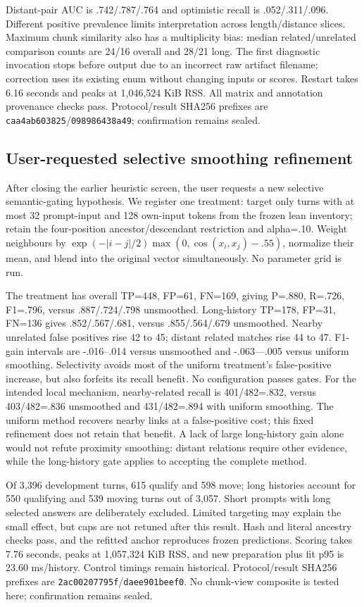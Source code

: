 \documentclass[11pt]{article}
\begin{document}
Distant-pair AUC is .742/.787/.764 and optimistic recall is .052/.311/.096.
Different positive prevalence limits interpretation across length/distance
slices. Maximum chunk similarity also has a multiplicity bias: median
related/unrelated comparison counts are 24/16 overall and 28/21 long.
The first diagnostic invocation stops before output due to an incorrect raw
artifact filename; correction uses its existing enum without changing inputs
or scores. Restart takes 6.16 seconds and peaks at 1,046,524 KiB RSS. All matrix
and annotation provenance checks pass. Protocol/result SHA256 prefixes are
\texttt{caa4ab603825}/\texttt{098986438a49}; confirmation remains sealed.

\subsection{User-requested selective smoothing refinement}
After closing the earlier heuristic screen, the user requests a new selective
semantic-gating hypothesis. We register one treatment: target only turns with
at most 32 prompt-input and 128 own-input tokens from the frozen lean inventory;
retain the four-position ancestor/descendant restriction and alpha=.10. Weight
neighbours by $\exp(-|i-j|/2)\max(0,\cos(x_i,x_j)-.55)$, normalize their mean,
and blend into the original vector simultaneously. No parameter grid is run.

The treatment has overall TP=448, FP=61, FN=169, giving P=.880, R=.726,
F1=.796, versus .887/.724/.798 unsmoothed. Long-history TP=178, FP=31,
FN=136 gives .852/.567/.681, versus .855/.564/.679 unsmoothed. Nearby unrelated
false positives rise 42 to 45; distant related matches rise 44 to 47. F1-gain
intervals are -.016--.014 versus unsmoothed and -.063---.005 versus uniform
smoothing. Selectivity avoids most of the uniform treatment's false-positive
increase, but also forfeits its recall benefit. No configuration passes gates.
For the intended local mechanism, nearby-related recall is 401/482=.832,
versus 403/482=.836 unsmoothed and 431/482=.894 with uniform smoothing.
The uniform method recovers nearby links at a false-positive cost; this fixed
refinement does not retain that benefit. A lack of large long-history gain
alone would not refute proximity smoothing: distant relations require other
evidence, while the long-history gate applies to accepting the complete method.

Of 3,396 development turns, 615 qualify and 598 move; long histories account
for 550 qualifying and 539 moving turns out of 3,057. Short prompts with long
selected answers are deliberately excluded. Limited targeting may explain the
small effect, but caps are not retuned after this result. Hash and literal
ancestry checks pass, and the refitted anchor reproduces frozen predictions.
Scoring takes 7.76 seconds, peaks at 1,057,324 KiB RSS, and new preparation plus
fit p95 is 23.60 ms/history. Control timings remain historical. Protocol/result
SHA256 prefixes are \texttt{2ac00207795f}/\texttt{daee901beef0}. No chunk-view
composite is tested here; confirmation remains sealed.
\end{document}
